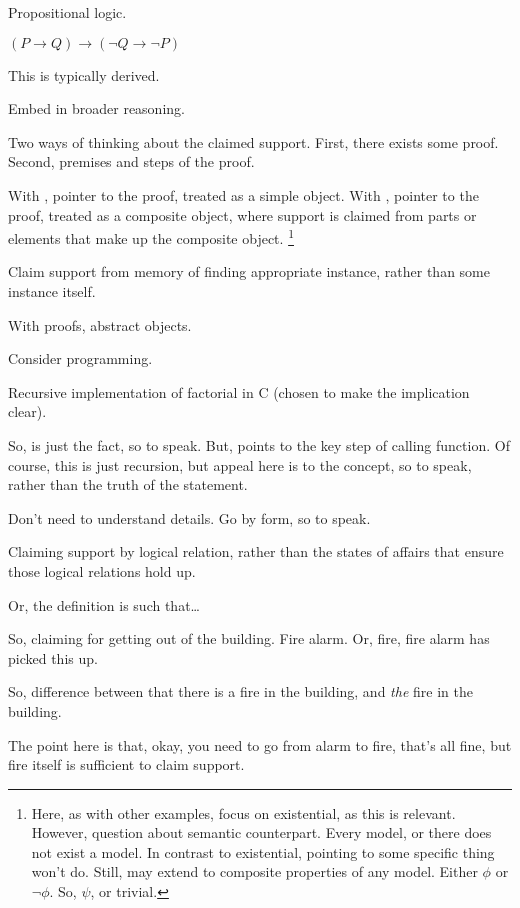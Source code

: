 \begin{note}
  Propositional logic.

  \((P \rightarrow Q) \rightarrow (\lnot Q \rightarrow \lnot P)\)

  This is typically derived.

  Embed in broader reasoning.

  Two ways of thinking about the claimed support.
  First, there exists some proof.
  Second, premises and steps of the proof.

  With \adS{}, pointer to the proof, treated as a simple object.
  With \adC{}, pointer to the proof, treated as a composite object, where support is claimed from parts or elements that make up the composite object.\nolinebreak
  \footnote{
    Here, as with other examples, focus on existential, as this is relevant.
    However, question about semantic counterpart.
    Every model, or there does not exist a model.
    In contrast to existential, pointing to some specific thing won't do.
    Still, may extend to composite properties of any model.
    Either \(\phi\) or \(\lnot\phi\).
    So, \(\psi\), or trivial.
  }

  Claim support from memory of finding appropriate instance, rather than some instance itself.
\end{note}

\begin{note}
  With proofs, abstract objects.

  Consider programming.

  Recursive implementation of factorial in C (chosen to make the implication clear).

  So, \adS{} is just the fact, so to speak.
  But, \adC{} points to the key step of calling function.
  Of course, this is just recursion, but appeal here is to the concept, so to speak, rather than the truth of the statement.

  Don't need to understand details.
  Go by form, so to speak.

  Claiming support by logical relation, rather than the states of affairs that ensure those logical relations hold up.

  Or, the definition is such that\dots
\end{note}

\begin{note}
  So, claiming for getting out of the building.
  Fire alarm.
  Or, fire, fire alarm has picked this up.

  So, difference between that there is a fire in the building, and \emph{the} fire in the building.

  The point here is that, okay, you need to go from alarm to fire, that's all fine, but fire itself is sufficient to claim support.
\end{note}

